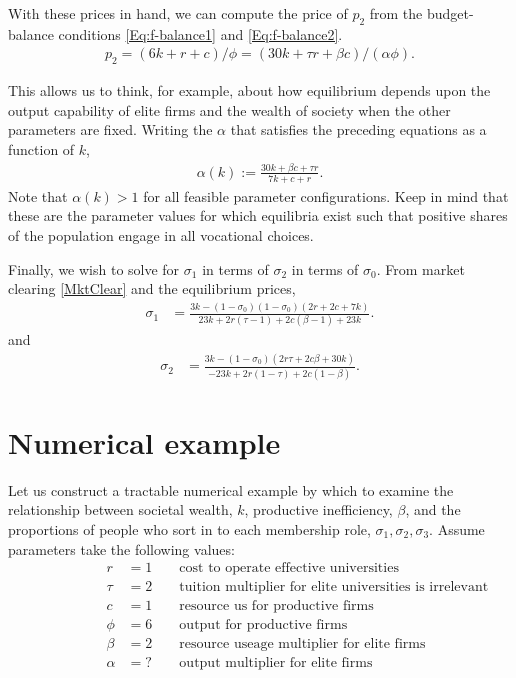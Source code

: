 \documentclass[12pt,letterpaper]{article}
\begin{document}
	With these prices in hand, we can compute the price of $p_2$ from the budget-balance conditions \eqref{Eq:f-balance1} and \eqref{Eq:f-balance2}.
	\begin{align}
		p_2=\left(6k+r+c\right)/\phi
		=\left(30k+\tau r+\beta c\right)/(\alpha\phi).\label{PriceOf2}
	\end{align}
	
	This allows us to think, for example, about how equilibrium depends upon the output capability of elite firms and the wealth of society when the other parameters are fixed.
	Writing the $\alpha$ that satisfies the preceding equations as a function of $k$,
	\begin{align}
		\alpha(k):=\frac{30k+\beta c+\tau r}{7k+c+r}.
	\end{align}
	Note that   $\alpha(k)>1$ for all feasible parameter configurations.
	Keep in mind that these are the parameter values for which equilibria exist such that positive shares of the population engage in all vocational choices.
	
	Finally, we wish to solve for $\sigma_1$ in terms of $\sigma_2$ in terms of $\sigma_0$. From market clearing \eqref{MktClear} and the equilibrium prices,	
	\begin{align}
		\sigma_1&=
		\frac{3k-(1-\sigma_0)(1-\sigma_0)(2r + 2c +7k)}
		{23k + 2r(\tau-1) + 2c(\beta-1) +23k}\label{Example Sigma1}.
	\end{align}
	and
	\begin{align}
		\sigma_2&=
		\frac{3k-(1-\sigma_0)(2r\tau + 2c\beta +30k)}
		{-23k + 2r(1-\tau) + 2c(1-\beta)}.\label{Example Sigma2}			
	\end{align} 
	
	
	\section{Numerical example}
	Let us construct a tractable numerical example by which to examine the relationship between societal wealth, $k$, productive inefficiency, $\beta$, and the proportions of people who sort in to each membership role, $\sigma_1,\sigma_2,\sigma_3$.
	Assume parameters take the following values:
		\begin{align*}
		\phantom{====}	r&=1&&\text{ cost to operate effective universities}\\
		\phantom{====}	\tau&=2&&\text{ tuition multiplier for elite universities is irrelevant}\\
		\phantom{====}	c&=1&&\text{ resource us for productive firms}\\
		\phantom{====}	\phi&=6&&\text{ output for productive firms}\\
		\phantom{====}	\beta&=2&&\text{ resource useage multiplier for elite firms}\\
		\phantom{====}	\alpha&=?&&\text{ output multiplier for elite firms}		
	\end{align*}
	
\end{document}
